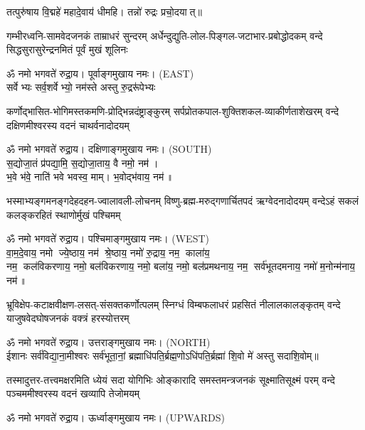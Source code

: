 {\small \closesection}

\begin{center}
तत्पुरु॑षाय वि॒द्महे॑ महादे॒वाय॑ धीमहि। तन्नो॑ रुद्रः प्रचो॒दयात्॥

{गम्भीरध्वनि-सामवेदजनकं ताम्राधरं सुन्दरम्}
{अर्धेन्दुद्युति-लोल-पिङ्गल-जटाभार-प्रबोद्धोदकम्}
{वन्दे सिद्धसुरासुरेन्द्रनमितं पूर्वं मुखं शूलिनः}

ॐ नमो भगवते॑ रुद्रा॒य। पूर्वाङ्गमुखाय नमः। {\scriptsize (EAST)}\\[1em]

{सर्वेभ्यः सर्व॒शर्वेभ्यो॒ नम॑स्ते अस्तु रु॒द्ररू॑पेभ्यः}

{कर्णोद्भासित-भोगिमस्तकमणि-प्रोद्भिन्नदंष्ट्राङ्कुरम्}
{सर्पप्रोतकपाल-शुक्तिशकल-व्याकीर्णताशेखरम्}
{वन्दे दक्षिणमीश्वरस्य वदनं चाथर्वनादोदयम्}

ॐ नमो भगवते॑ रुद्रा॒य। दक्षिणाङ्गमुखाय नमः। {\scriptsize (SOUTH)}\\[1em]

स॒द्योजा॒तं प्र॑पद्या॒मि॒ स॒द्योजा॒ताय॒ वै नमो॒ नम॑।\\
भ॒वे भ॑वे॒ नाति॑ भवे भवस्व॒ माम्। भ॒वोद्भ॑वाय॒ नम॑॥ 

{भस्माभ्यङ्गमनङ्गदेहदहन-ज्वालावली-लोचनम्}
{विष्णु-ब्रह्म-मरुद्गणार्चितपदं ऋग्वेदनादोदयम्}
{वन्देऽहं सकलं कलङ्करहितं स्थाणोर्मुखं पश्चिमम्}

ॐ नमो भगवते॑ रुद्रा॒य। पश्चिमाङ्गमुखाय नमः। {\scriptsize (WEST)}\\[1em]

वा॒म॒दे॒वाय॒ नमो ज्ये॒ष्ठाय॒ नम॑ श्रे॒ष्ठाय॒ नमो॑ रु॒द्राय॒ नम॒ काला॑य॒\\ नम॒ कल॑विकरणाय॒ नमो॒ बल॑विकरणाय॒ नमो॒ बला॑य॒ नमो॒ बल॑प्रमथनाय॒ नम॒ सर्व॑भूतदमनाय॒ नमो॑ म॒नोन्म॑नाय॒ नम॑॥

{भ्रूविक्षेप-कटाक्षवीक्षण-लसत्-संसक्तकर्णोत्पलम्}
{स्निग्धं विम्बफलाधरं प्रहसितं नीलालकालङ्कृतम्}
{वन्दे याजुषवेदघोषजनकं वक्त्रं हरस्योत्तरम्}

ॐ नमो भगवते॑ रुद्रा॒य। उत्तराङ्गमुखाय नमः। {\scriptsize (NORTH)}\\[1em]

ईशानः सर्व॑विद्या॒ना॒मीश्वरः सर्व॑भूता॒नां॒ ब्रह्माधि॑पति॒र्ब्रह्म॒णोऽधि॑पति॒र्ब्रह्मा॑ शि॒वो मे॑ अस्तु सदाशि॒वोम्॥

{तस्मादुत्तर-तत्त्वमक्षरमिति ध्येयं सदा योगिभिः}
{ओङ्कारादि समस्तमन्त्रजनकं सूक्ष्मातिसूक्ष्मं परम्}
{वन्दे पञ्चममीश्वरस्य वदनं खव्यापि तेजोमयम्}

ॐ नमो भगवते॑ रुद्रा॒य। ऊर्ध्वाङ्गमुखाय नमः। {\scriptsize (UPWARDS)}\\[1em]

\end{center}

